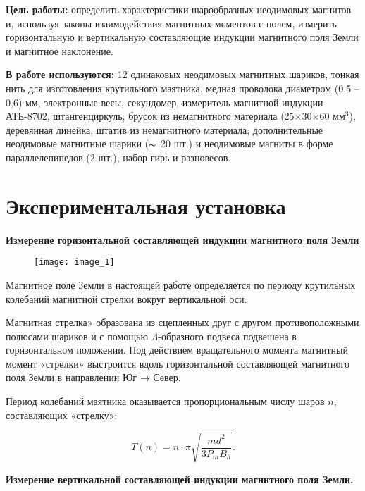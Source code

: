 






\textbf{Цель работы:} определить характеристики шарообразных неодимовых магнитов и, используя законы взаимодействия магнитных моментов с полем, измерить горизонтальную и вертикальную составляющие индукции магнитного поля Земли и магнитное наклонение.

\textbf{В работе используются:} 12 одинаковых неодимовых магнитных шариков, тонкая нить для изготовления крутильного маятника, медная проволока диаметром (0,5 – 0,6) мм, электронные весы, секундомер, измеритель магнитной индукции АТЕ-8702, штангенциркуль, брусок из немагнитного материала (25$\times$30$\times$60 мм$^3$), деревянная линейка, штатив из немагнитного материала; дополнительные неодимовые магнитные шарики ($\thicksim$ 20 шт.) и неодимовые магниты в форме параллелепипедов (2 шт.), набор гирь и разновесов.

\section*{Экспериментальная установка}

\textbf{Измерение горизонтальной составляющей индукции магнитного поля Земли}


\begin{figure}[h!]
	\centering
	\texttt{[image: image\_1]}
\end{figure}

Магнитное поле Земли в настоящей работе определяется по периоду крутильных колебаний магнитной стрелки вокруг вертикальной оси.

Магнитная стрелка» образована из сцепленных друг с другом противоположными полюсами шариков и с помощью $\Lambda$-образного подвеса подвешена в горизонтальном положении. Под действием вращательного момента магнитный момент «стрелки» выстроится вдоль горизонтальной составляющей магнитного поля Земли в направлении Юг → Север.

Период колебаний маятника оказывается пропорциональным числу шаров $n$, составляющих «стрелку»:

\begin{equation*}
	T(n) = n \cdot \pi\sqrt{\frac{md^2}{3P_mB_h}}.
\end{equation*}
\vspace{20mm}

\textbf{Измерение вертикальной составляющей индукции магнитного поля Земли.}

